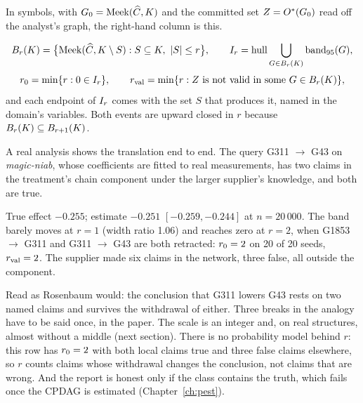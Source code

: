 In symbols, with $G_0 = \mathrm{Meek}(\widehat{C}, K)$ and the committed set $Z = O^{*}(G_0)$ read off
the analyst's graph, the right-hand column is this.

\begin{formulabox}
\[
B_{r}(K) = \bigl\{\mathrm{Meek}(\widehat{C}, K \setminus S) : S \subseteq K,\ |S| \le r\bigr\},
\qquad
I_{r} = \operatorname{hull} \bigcup_{G \in B_{r}(K)} \mathrm{band}_{95}(G),
\]
\[
r_{0} = \min\{r : 0 \in I_{r}\}, \qquad
r_{\mathrm{val}} = \min\{r : Z \text{ is not valid in some } G \in B_{r}(K)\},
\]
and each endpoint of $I_{r}$ comes with the set $S$ that produces it, named in the domain's
variables. Both events are upward closed in $r$ because $B_{r}(K) \subseteq B_{r+1}(K)$.
\end{formulabox}

A real analysis shows the translation end to end. The query G311 $\to$ G43 on \emph{magic-niab},
whose coefficients are fitted to real measurements, has two claims in the treatment's chain
component under the larger supplier's knowledge, and both are true.

\begin{medido}
True effect $-0.255$; estimate $-0.251$ $[-0.259, -0.244]$ at $n = 20\,000$. The band barely moves at
$r = 1$ (width ratio 1.06) and reaches zero at $r = 2$, when G1853 $\to$ G311 and G311 $\to$ G43 are
both retracted: $r_{0} = 2$ on 20 of 20 seeds, $r_{\mathrm{val}} = 2$. The supplier made six claims in the
network, three false, all outside the component.
\end{medido}

Read as Rosenbaum would: the conclusion that G311 lowers G43 rests on two named claims and survives the
withdrawal of either. Three breaks in the analogy have to be said once, in the paper. The scale is an
integer and, on real structures, almost without a middle (next section). There is no probability model
behind $r$: this row has $r_{0} = 2$ with both local claims true and three false claims elsewhere, so
$r$ counts claims whose withdrawal changes the conclusion, not claims that are wrong. And the report is
honest only if the class contains the truth, which fails once the CPDAG is estimated
(Chapter~\ref{ch:pest}).


